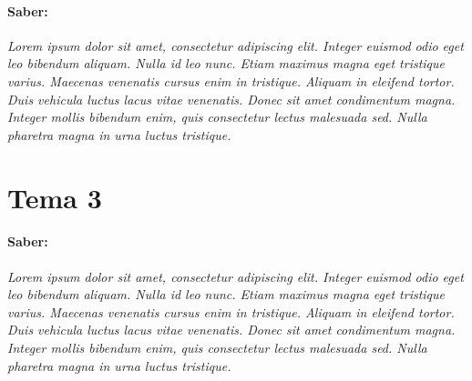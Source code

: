 \paragraph{Saber: }
\textit{
	Lorem ipsum dolor sit amet, consectetur adipiscing elit. Integer euismod odio eget leo bibendum aliquam. Nulla id leo nunc. Etiam maximus magna eget tristique varius. Maecenas venenatis cursus enim in tristique. Aliquam in eleifend tortor. Duis vehicula luctus lacus vitae venenatis. Donec sit amet condimentum magna. Integer mollis bibendum enim, quis consectetur lectus malesuada sed. Nulla pharetra magna in urna luctus tristique.
}

\section{Tema 3}
\paragraph{Saber: }
\textit{
	Lorem ipsum dolor sit amet, consectetur adipiscing elit. Integer euismod odio eget leo bibendum aliquam. Nulla id leo nunc. Etiam maximus magna eget tristique varius. Maecenas venenatis cursus enim in tristique. Aliquam in eleifend tortor. Duis vehicula luctus lacus vitae venenatis. Donec sit amet condimentum magna. Integer mollis bibendum enim, quis consectetur lectus malesuada sed. Nulla pharetra magna in urna luctus tristique.
}
